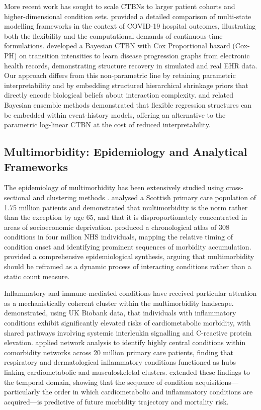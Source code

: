 \documentclass[12pt]{article}
\begin{document}
More recent work has sought to scale CTBNs to larger patient cohorts and
higher-dimensional condition sets.  \citet{jackson2022comparison} provided a
detailed comparison of multi-state modelling frameworks in the context of
COVID-19 hospital outcomes, illustrating both the flexibility and the
computational demands of continuous-time formulations.  \citet{guillamet2025ctbn}
developed a Bayesian CTBN with Cox Proportional hazard (Cox-PH) on transition
intensities to learn disease progression graphs from electronic health records,
demonstrating structure recovery in simulated and real EHR data.  Our approach
differs from this non-parametric line by retaining parametric interpretability
and by embedding structured hierarchical shrinkage priors that directly encode
biological beliefs about interaction complexity.  \citet{linero2018bayesian}
and related Bayesian ensemble methods demonstrated that flexible regression
structures can be embedded within event-history models, offering an alternative
to the parametric log-linear CTBN at the cost of reduced interpretability.

\subsection{Multimorbidity: Epidemiology and Analytical Frameworks}

The epidemiology of multimorbidity has been extensively studied using
cross-sectional and clustering methods \citep{barnett2012epidemiology,
nicholson2019multimorbidity, valabhji2024prevalence}.  \citet{barnett2012epidemiology}
analysed a Scottish primary care population of 1.75 million patients and
demonstrated that multimorbidity is the norm rather than the exception by age
65, and that it is disproportionately concentrated in areas of socioeconomic
deprivation.  \citet{kuan2019chronological} produced a chronological atlas of
308 conditions in four million NHS individuals, mapping the relative timing of
condition onset and identifying prominent sequences of morbidity accumulation.
\citet{skou2022multimorbidity} provided a comprehensive epidemiological synthesis,
arguing that multimorbidity should be reframed as a dynamic process of
interacting conditions rather than a static count measure.

Inflammatory and immune-mediated conditions have received particular attention
as a mechanistically coherent cluster within the multimorbidity landscape.
\citet{cheng2024chronic} demonstrated, using UK Biobank data, that
individuals with inflammatory conditions exhibit significantly elevated risks
of cardiometabolic morbidity, with shared pathways involving systemic
interleukin signalling and C-reactive protein elevation.
\citet{valabhji2024prevalence} applied network analysis to identify highly
central conditions within comorbidity networks across 20 million primary care
patients, finding that respiratory and dermatological inflammatory conditions
functioned as hubs linking cardiometabolic and musculoskeletal clusters.
\citet{yang2024longitudinal} extended these findings to the temporal domain,
showing that the sequence of condition acquisitions---particularly the order
in which cardiometabolic and inflammatory conditions are acquired---is
predictive of future morbidity trajectory and mortality risk.
\end{document}
